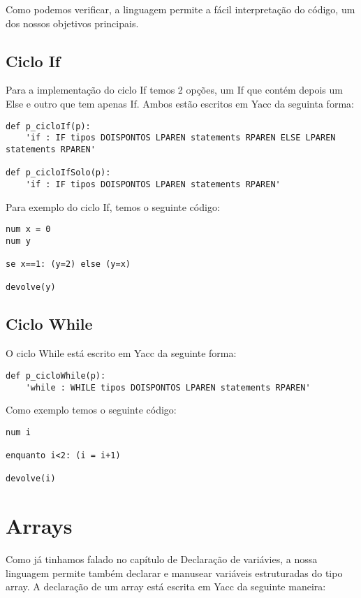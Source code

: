 \documentclass[11pt,a4paper]{report}%
\begin{document}
Como podemos verificar, a linguagem permite a fácil interpretação do código, um dos nossos objetivos principais.


\subsection{Ciclo If}

Para a implementação do ciclo If temos 2 opções, um If que contém depois um Else e outro que tem apenas If. Ambos estão escritos em Yacc da seguinta forma:

\begin{verbatim}
def p_cicloIf(p): 
    'if : IF tipos DOISPONTOS LPAREN statements RPAREN ELSE LPAREN statements RPAREN'

def p_cicloIfSolo(p):
    'if : IF tipos DOISPONTOS LPAREN statements RPAREN'
\end{verbatim}

Para exemplo do ciclo If, temos o seguinte código:
\\
\begin{lstlisting}[frame=single,numbers=none]
num x = 0 
num y

se x==1: (y=2) else (y=x)

devolve(y)
\end{lstlisting}


\subsection{Ciclo While}

O ciclo While está escrito em Yacc da seguinte forma:

\begin{verbatim}
def p_cicloWhile(p):
    'while : WHILE tipos DOISPONTOS LPAREN statements RPAREN'
\end{verbatim}

Como exemplo temos o seguinte código:
\\
\begin{lstlisting}[frame=single,numbers=none]
num i 

enquanto i<2: (i = i+1)

devolve(i)
\end{lstlisting}

\section{Arrays}

Como já tinhamos falado no capítulo de Declaração de variávies, a nossa linguagem permite também declarar e manusear variáveis estruturadas do tipo array. A declaração de um array está escrita em Yacc da seguinte maneira:
\end{document}
